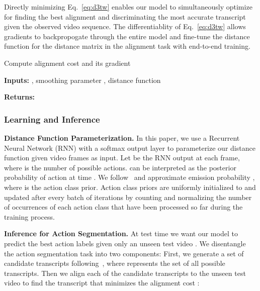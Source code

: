 \documentclass[10pt,twocolumn,letterpaper]{article}
\newcommand{\eqnref}[1]{{Eq.\ \eqref{eq:#1}}}
\begin{document}
Directly minimizing \eqnref{d3tw} enables our model to simultaneously optimize for finding the best alignment and discriminating the most accurate transcript given the observed video sequence. 
The differentiablity of \eqnref{d3tw} allows gradients to backpropogate through the entire model and fine-tune the distance function  for the distance matrix  in the alignment task with end-to-end training. 



\begin{algorithm}[t]
\small
\caption{Compute alignment cost  and its gradient  }\label{algo:dtw}
\begin{algorithmic}[1]
\State \textbf{Inputs:} , smoothing parameter , distance function 

\State 
\State 
\For{}
    \State 
    \State 
\EndFor
\EndProcedure
{}
\State 
\State 
\State 
\For{}
    \State 
\EndFor
\EndProcedure
\State \textbf{Returns:} 
\end{algorithmic}
\end{algorithm}




\subsubsection{Learning and Inference}
\label{sec:method_learning_inference}
\vspace{1mm}
\noindent\textbf{Distance Function Parameterization.} 
In this paper, we use a Recurrent Neural Network (RNN) with a softmax output layer to parameterize our distance function  given video frames as input. Let  be the RNN output at each frame, where  is the number of possible actions.  can be interpreted as the posterior probability of action  at time . We follow~\cite{richard2018neuralnetwork} and approximate emission probability , where  is the action class prior. Action class priors are uniformly initialized to  and updated after every batch of iterations by counting and normalizing the number of occurrences of each action class that have been processed so far during the training process.

\vspace{1mm}
\noindent\textbf{Inference for Action Segmentation.} 
At test time we want our model to predict the best action labels  given only an unseen test video . We disentangle the action segmentation task into two components: First, we generate a set of candidate transcripts  following~\cite{richard2018neuralnetwork}, where  represents the set of all possible transcripts. 
Then we align each of the candidate transcripts to the unseen test video  to find the transcript  that minimizes the alignment cost :
\end{document}
